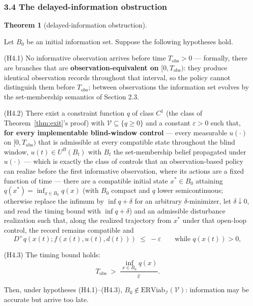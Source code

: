 \documentclass[10pt,twocolumn]{article}
\theoremstyle{definition}
\newtheorem{theorem}{Theorem}
\begin{document}
\subsubsection{3.4 The delayed-information
obstruction}\label{the-delayed-information-obstruction}

\begin{theorem}[delayed-information obstruction]\label{thm:delayed}

Let \(B_0\) be an initial information set. Suppose the following
hypotheses hold.

(H4.1) No informative observation arrives before time
\(T_{\mathrm{obs}} > 0\) --- formally, there are branches that are
\textbf{observation-equivalent on \([0, T_{\mathrm{obs}})\)}: they
produce identical observation records throughout that interval, so the
policy cannot distinguish them before \(T_{\mathrm{obs}}\); between
observations the information set evolves by the set-membership semantics
of Section 2.3.

(H4.2) There exist a constraint function \(q\) of class \(C^1\) (the
class of Theorem~\ref{thm:exit}'s proof) with \(\mathcal{V} \subseteq \{ q \ge 0 \}\)
and a constant \(\varepsilon > 0\) such that, \textbf{for every implementable blind-window control} --- every
measurable \(u(\cdot)\) on \([0, T_{\mathrm{obs}})\) that is admissible at
every compatible state throughout the blind window, \(u(t) \in U^B(B_t)\)
with \(B_t\) the set-membership belief propagated under \(u(\cdot)\) ---
which is exactly the class of controls that an observation-based policy
can realize before the first informative observation, where its actions
are a fixed function of time --- there are a compatible initial state \(x^* \in B_0\) attaining
\(q(x^*) = \inf_{x \in B_0} q(x)\) (with \(B_0\) compact and \(q\) lower
semicontinuous; otherwise replace the infimum by \(\inf q + \delta\) for
an arbitrary \(\delta\)-minimizer, let \(\delta \downarrow 0\), and read
the timing bound with \(\inf q + \delta\)) and an admissible disturbance
realization such that, along the realized trajectory from \(x^*\) under
that open-loop control, the record remains compatible and
\[D^+ q(x(t); f(x(t), u(t), d(t))) \;\le\; -\varepsilon \qquad \text{while } q(x(t)) > 0, \tag{3}\]

(H4.3) The timing bound holds:
\[T_{\mathrm{obs}} \;>\; \frac{\inf_{x \in B_0} q(x)}{\varepsilon}. \tag{4}\]

Then, under hypotheses (H4.1)--(H4.3),
\(B_0 \notin \mathrm{ERViab}_{\mathcal{I}}(\mathcal{V})\): information
may be accurate but arrive too late.

\end{theorem}
\end{document}
